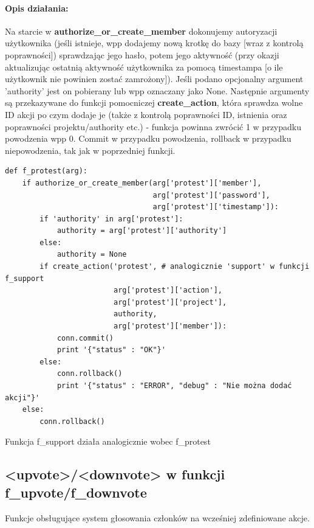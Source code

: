 \documentclass{article}
\begin{document}
\paragraph{Opis działania: }
Na starcie w \textbf{authorize\_or\_create\_member} dokonujemy autoryzacji użytkownika
(jeśli istnieje, wpp dodajemy nową krotkę do bazy [wraz z kontrolą poprawności]) sprawdzając jego hasło, potem jego aktywność (przy okazji aktualizując ostatnią aktywność użytkownika za pomocą timestampa [o ile użytkownik nie powinien zostać zamrożony]). \newline
Jeśli podano opcjonalny argument 'authority' jest on pobierany lub wpp oznaczany jako None. Następnie argumenty są przekazywane do funkcji pomocniczej \textbf{create\_action}, która sprawdza wolne ID akcji po czym dodaje je (także z kontrolą poprawności ID, istnienia oraz poprawności projektu/authority etc.) - funkcja powinna zwrócić 1 w przypadku powodzenia wpp 0.\newline
Commit w przypadku powodzenia, rollback w przypadku niepowodzenia, tak jak w poprzedniej funkcji.
\begin{verbatim}
def f_protest(arg):
    if authorize_or_create_member(arg['protest']['member'],
                                  arg['protest']['password'],
                                  arg['protest']['timestamp']):  
        if 'authority' in arg['protest']: 
            authority = arg['protest']['authority']
        else: 
            authority = None
        if create_action('protest', # analogicznie 'support' w funkcji f_support 
                         arg['protest']['action'],
                         arg['protest']['project'],
                         authority,
                         arg['protest']['member']):
            conn.commit()
            print '{"status" : "OK"}'
        else: 
            conn.rollback()
            print '{"status" : "ERROR", "debug" : "Nie można dodać akcji"}'
    else:
        conn.rollback()
\end{verbatim}
Funkcja f\_support działa analogicznie wobec f\_protest






\newpage
\subsection{<upvote>/<downvote> w funkcji f\_upvote/f\_downvote }
Funkcje obsługujące system głosowania członków na wcześniej zdefiniowane akcje.
\end{document}
